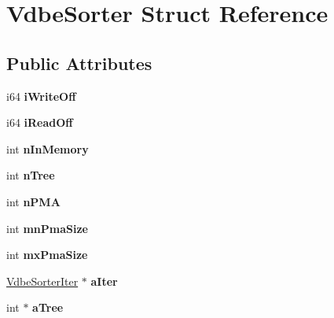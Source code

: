 \hypertarget{struct_vdbe_sorter}{\section{Vdbe\-Sorter Struct Reference}
\label{struct_vdbe_sorter}
}
\subsection*{Public Attributes}
\begin{DoxyCompactItemize}
\item 
\hypertarget{struct_vdbe_sorter_a5024b3ed80ebd013cad0bc694c81f488}{i64 {\bfseries i\-Write\-Off}}\label{struct_vdbe_sorter_a5024b3ed80ebd013cad0bc694c81f488}

\item 
\hypertarget{struct_vdbe_sorter_a5064ee91d2256d6176210b1556c13790}{i64 {\bfseries i\-Read\-Off}}\label{struct_vdbe_sorter_a5064ee91d2256d6176210b1556c13790}

\item 
\hypertarget{struct_vdbe_sorter_a4704f2debfdf60eeed3ea8cf95d142f9}{int {\bfseries n\-In\-Memory}}\label{struct_vdbe_sorter_a4704f2debfdf60eeed3ea8cf95d142f9}

\item 
\hypertarget{struct_vdbe_sorter_a771cf7f8d421372bf58696cbec5d73dc}{int {\bfseries n\-Tree}}\label{struct_vdbe_sorter_a771cf7f8d421372bf58696cbec5d73dc}

\item 
\hypertarget{struct_vdbe_sorter_a66e6ce431d22c97a6dc672fa94a16e3e}{int {\bfseries n\-P\-M\-A}}\label{struct_vdbe_sorter_a66e6ce431d22c97a6dc672fa94a16e3e}

\item 
\hypertarget{struct_vdbe_sorter_a6d201d0f496260f7f2c7f450cae5898b}{int {\bfseries mn\-Pma\-Size}}\label{struct_vdbe_sorter_a6d201d0f496260f7f2c7f450cae5898b}

\item 
\hypertarget{struct_vdbe_sorter_ab23b8039f7b58052b6c6dfc32aa895ed}{int {\bfseries mx\-Pma\-Size}}\label{struct_vdbe_sorter_ab23b8039f7b58052b6c6dfc32aa895ed}

\item 
\hypertarget{struct_vdbe_sorter_a7c4748645307e20a863cc50ddb75abef}{\hyperlink{struct_vdbe_sorter_iter}{Vdbe\-Sorter\-Iter} $\ast$ {\bfseries a\-Iter}}\label{struct_vdbe_sorter_a7c4748645307e20a863cc50ddb75abef}

\item 
\hypertarget{struct_vdbe_sorter_a77ff5480e8adac1521775d2e8a7be04f}{int $\ast$ {\bfseries a\-Tree}}\label{struct_vdbe_sorter_a77ff5480e8adac1521775d2e8a7be04f}


\end{DoxyCompactItemize}
